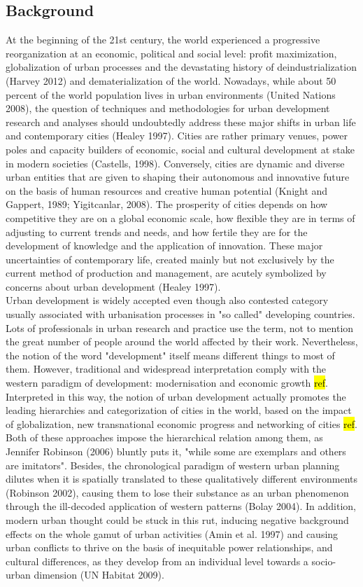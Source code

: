 \documentclass[11pt]{report}
\begin{document}
\subsection{Background}
At the beginning of the 21st century, the world experienced a progressive reorganization at an economic, political and social level: profit maximization, globalization of urban processes and the devastating history of deindustrialization (Harvey 2012) and dematerialization of the world. Nowadays, while about 50 percent of the world population lives in urban environments (United Nations 2008), the question of techniques and methodologies for urban development research and analyses should undoubtedly address these major shifts in urban life and contemporary cities (Healey 1997). Cities are rather primary venues, power poles and capacity builders of economic, social and cultural development at stake in modern societies (Castells, 1998). Conversely, cities are dynamic and diverse urban entities that are given to shaping their autonomous and innovative future on the basis of human resources and creative human potential (Knight and Gappert, 1989; Yigitcanlar, 2008). The prosperity of cities depends on how competitive they are on a global economic scale, how flexible they are in terms of adjusting to current trends and needs, and how fertile they are for the development of knowledge and the application of innovation. These major uncertainties of contemporary life, created mainly but not exclusively by the current method of production and management, are acutely symbolized by concerns about urban development (Healey 1997).
\\
Urban development is widely accepted even though also contested category usually associated with urbanisation processes in "so called" developing countries. Lots of professionals in urban research and practice use the term, not to mention the great number of people around the world affected by their work. Nevertheless, the notion of the word "development" itself means different things to most of them.
However, traditional and widespread interpretation comply with the western paradigm of development: modernisation and economic growth \hl{ref}. Interpreted in this way, the notion of urban development actually promotes the leading hierarchies and categorization of cities in the world, based on the impact of globalization, new transnational  economic  progress  and  networking  of  cities \hl{ref}. Both of these approaches impose the hierarchical relation among them, as Jennifer Robinson (2006) bluntly puts it, "while some are exemplars and others are imitators". Besides, the chronological paradigm of western urban planning dilutes when it is spatially translated to these qualitatively different environments (Robinson 2002), causing them to lose their substance as an urban phenomenon through the ill-decoded application of western patterns (Bolay 2004). In addition, modern urban thought could be stuck in this rut, inducing negative background effects on the whole gamut of urban activities (Amin et al. 1997) and causing urban conflicts to thrive on the basis of inequitable power relationships, and cultural differences, as they develop from an individual level towards a socio-urban dimension (UN Habitat 2009).
\end{document}
